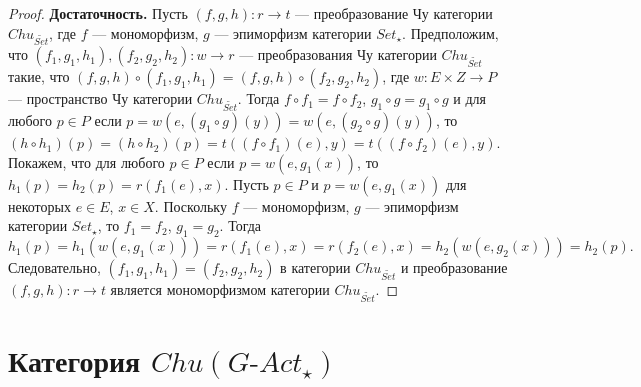 \documentclass[a4paper,12pt]{article}
\newcommand{\GAct}{G\text{-}Act}
\begin{document}
\begin{proof}
    \textbf{Достаточность.} Пусть $(f,g,h): r \to t$ --- преобразование Чу категории $Chu_{\widetilde{Set}}$, где $f$ --- мономорфизм, $g$ --- эпиморфизм категории $Set_{\star}$. Предположим, что $(f_1,g_1,h_1), (f_2,g_2,h_2): w \to r$ --- преобразования Чу категории $Chu_{\widetilde{Set}}$ такие, что $(f,g,h) \circ (f_1,g_1,h_1) = (f,g,h) \circ (f_2,g_2,h_2)$, где $w: E \times Z \to P$ --- пространство Чу категории $Chu_{\widetilde{Set}}$. Тогда $f \circ f_1 = f \circ f_2$, $g_1 \circ g = g_1 \circ g$ и для любого $p \in P$ если $p = w(e,(g_1 \circ g)(y)) = w(e,(g_2 \circ g)(y))$, то $(h \circ h_1)(p) = (h \circ h_2)(p) = t((f \circ f_1)(e), y) = t((f \circ f_2)(e), y)$. Покажем, что для любого $p \in P$ если $p = w(e,g_1(x))$, то $h_1(p) = h_2(p) = r(f_1(e),x)$. Пусть $p \in P$ и $p = w(e,g_1(x))$ для некоторых $e \in E$, $x \in X$. Поскольку $f$ --- мономорфизм, $g$ --- эпиморфизм категории $Set_{\star}$, то $f_1 = f_2$, $g_1 = g_2$. Тогда 
    $$
        h_1(p) = h_1(w(e,g_1(x))) = r(f_1(e),x) = r(f_2(e),x) = h_2(w(e,g_2(x))) = h_2(p).
    $$
    Следовательно, $(f_1,g_1,h_1) = (f_2,g_2,h_2)$ в категории $Chu_{\widetilde{Set}}$ и преобразование $(f,g,h): r \to t$ является мономорфизмом категории $Chu_{\widetilde{Set}}$.
\end{proof}

\section*{Категория $Chu(\GAct_{\star})$}
\end{document}
